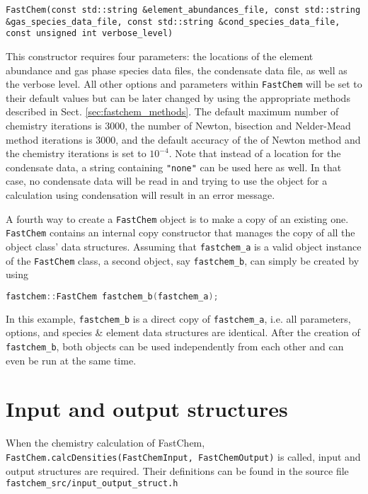 \documentclass[numbers=noenddot]{aux/fcmanual}
\newcommand{\fc}{\texttt{FastChem}\xspace}
\begin{document}
\bigbreak

\lstinline[breaklines=true]!FastChem(const std::string &element_abundances_file, const std::string &gas_species_data_file, const std::string &cond_species_data_file, const unsigned int verbose_level)!
\begin{addmargin}[25pt]{0pt}
	This constructor requires four parameters: the locations of the element abundance and gas phase species data files, the condensate data file, as well as the verbose level. All other options and parameters within \fc will be set to their default values but can be later changed by using the appropriate methods described in Sect. \ref{sec:fastchem_methods}. The default maximum number of chemistry iterations is 3000, the number of Newton, bisection and Nelder-Mead method iterations is 3000, and the default accuracy of the of Newton method and the chemistry iterations is set to $10^{-4}$. Note that instead of a location for the condensate data, a string containing \lstinline!"none"! can be used here as well. In that case, no condensate data will be read in and trying to use the object for a calculation using condensation will result in an error message.
\end{addmargin}

\bigbreak

A fourth way to create a \fc object is to make a copy of an existing one. \fc contains an internal copy constructor that manages the copy of all the object class' data structures. Assuming that \lstinline!fastchem_a! is a valid object instance of the \fc class, a second object, say \lstinline!fastchem_b!, can simply be created by using 
\begin{lstlisting}[language=C++]
  fastchem::FastChem fastchem_b(fastchem_a);
\end{lstlisting}

In this example, \lstinline!fastchem_b! is a direct copy of \lstinline!fastchem_a!, i.e. all parameters, options, and species \& element data structures are identical. After the creation of \lstinline!fastchem_b!, both objects can be used independently from each other and can even be run at the same time. 



\section{Input and output structures}

When the chemistry calculation of FastChem, \lstinline!FastChem.calcDensities(FastChemInput, FastChemOutput)! is called, input and output structures are required. Their definitions can be found in the source file \verb|fastchem_src/input_output_struct.h|
\end{document}
